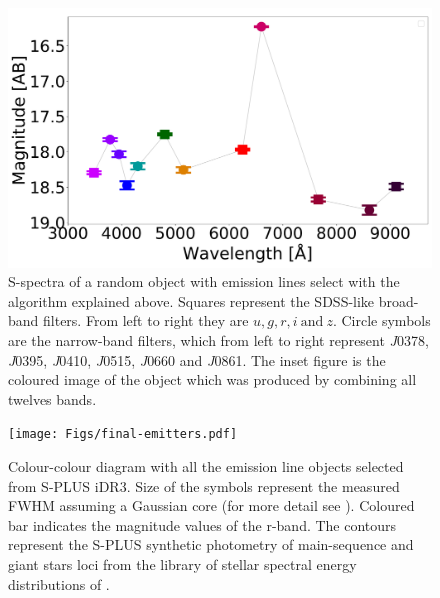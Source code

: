 \documentclass[fleqn,usenatbib]{mnras}
\begin{document}
\begin{figure}
\includegraphics[width=0.9\linewidth]{Figs/photopectrum_splus_HYDRA-0026-052331_Good-LD-Halpha-DR3_noFlag_merge-takeoutbad-Final_PStotal.pdf}
\centering
{}
\caption{S-spectra of a random object with emission lines select with the algorithm explained
  above. Squares represent the SDSS-like broad-band filters. From left to right 
  they are \(u, g, r, i~\text{and}~ z\). Circle symbols are the narrow-band filters,
  which from left to right represent \textit{J}0378, \textit{J}0395, \textit{J}0410,
  \textit{J}0515, \textit{J}0660 and \textit{J}0861. The inset figure is the coloured image 
  of the object which was produced by combining all twelves bands.}
\label{fig:Spectra}
\end{figure}

\begin{figure}
	\texttt{[image: Figs/final-emitters.pdf]}
        \caption{Colour-colour diagram with all the emission line objects selected
          from S-PLUS iDR3. Size of the symbols represent the measured FWHM assuming
          a Gaussian core (for more detail see \citealt{Fernandes:2021}). Coloured
          bar indicates the magnitude values of the r-band. The contours represent
          the S-PLUS synthetic photometry of main-sequence and giant stars loci from 
          the library of stellar spectral energy distributions of \citet{Pickles:1998}.}
    \label{fig:emission}
\end{figure} 
\end{document}
